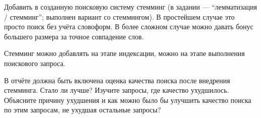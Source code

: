 \pagebreak
{}

Добавить в созданную поисковую систему стемминг (в задании --- \enquote{лемматизация / стемминг}; выполнен вариант со стеммингом). В простейшем случае это просто поиск без учёта словоформ. В более сложном случае можно давать бонус большего размера за точное совпадение слов.

Стемминг можно добавлять на этапе индексации, можно на этапе выполнения поискового запроса.

В отчёте должна быть включена оценка качества поиска после внедрения стемминга. Стало ли лучше? Изучите запросы, где качество ухудшилось. Объясните причину ухудшения и как можно было бы улучшить качество поиска по этим запросам, не ухудшая остальные запросы?
